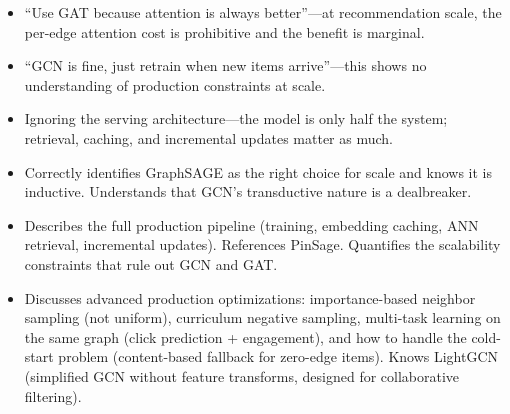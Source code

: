 \begin{interviewq}
\redflags
\begin{itemize}
    \item ``Use GAT because attention is always better''---at recommendation scale, the per-edge attention cost is prohibitive and the benefit is marginal.
    \item ``GCN is fine, just retrain when new items arrive''---this shows no understanding of production constraints at scale.
    \item Ignoring the serving architecture---the model is only half the system; retrieval, caching, and incremental updates matter as much.
\end{itemize}


\goodgreat
\begin{itemize}
    \item {} Correctly identifies GraphSAGE as the right choice for scale and knows it is inductive. Understands that GCN's transductive nature is a dealbreaker.
    \item {} Describes the full production pipeline (training, embedding caching, ANN retrieval, incremental updates). References PinSage. Quantifies the scalability constraints that rule out GCN and GAT.
    \item {} Discusses advanced production optimizations: importance-based neighbor sampling (not uniform), curriculum negative sampling, multi-task learning on the same graph (click prediction + engagement), and how to handle the cold-start problem (content-based fallback for zero-edge items). Knows LightGCN (simplified GCN without feature transforms, designed for collaborative filtering).
\end{itemize}

\end{interviewq}

